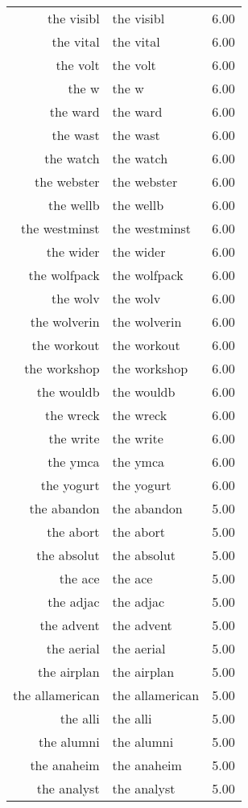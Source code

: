 \begin{table}[ht]
\begin{tabular}{rlr}
  the visibl & the visibl & 6.00 \\ 
  the vital & the vital & 6.00 \\ 
  the volt & the volt & 6.00 \\ 
  the w & the w & 6.00 \\ 
  the ward & the ward & 6.00 \\ 
  the wast & the wast & 6.00 \\ 
  the watch & the watch & 6.00 \\ 
  the webster & the webster & 6.00 \\ 
  the wellb & the wellb & 6.00 \\ 
  the westminst & the westminst & 6.00 \\ 
  the wider & the wider & 6.00 \\ 
  the wolfpack & the wolfpack & 6.00 \\ 
  the wolv & the wolv & 6.00 \\ 
  the wolverin & the wolverin & 6.00 \\ 
  the workout & the workout & 6.00 \\ 
  the workshop & the workshop & 6.00 \\ 
  the wouldb & the wouldb & 6.00 \\ 
  the wreck & the wreck & 6.00 \\ 
  the write & the write & 6.00 \\ 
  the ymca & the ymca & 6.00 \\ 
  the yogurt & the yogurt & 6.00 \\ 
  the abandon & the abandon & 5.00 \\ 
  the abort & the abort & 5.00 \\ 
  the absolut & the absolut & 5.00 \\ 
  the ace & the ace & 5.00 \\ 
  the adjac & the adjac & 5.00 \\ 
  the advent & the advent & 5.00 \\ 
  the aerial & the aerial & 5.00 \\ 
  the airplan & the airplan & 5.00 \\ 
  the allamerican & the allamerican & 5.00 \\ 
  the alli & the alli & 5.00 \\ 
  the alumni & the alumni & 5.00 \\ 
  the anaheim & the anaheim & 5.00 \\ 
  the analyst & the analyst & 5.00 \\ 

\end{tabular}
\end{table}
